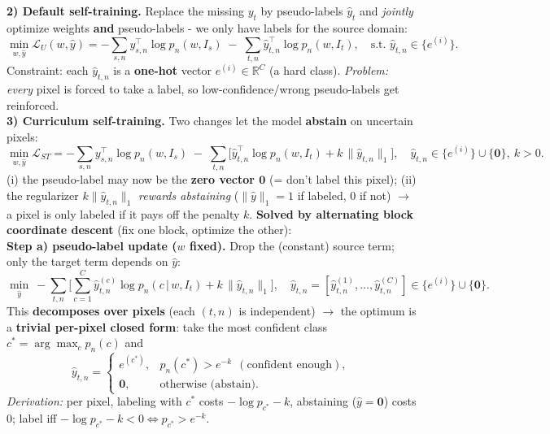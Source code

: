 \documentclass{article}
\begin{document}
\textbf{2) Default self-training.} Replace the missing $y_t$ by pseudo-labels $\hat y_t$ and \textit{jointly} optimize weights \textbf{and} pseudo-labels - we only have labels for the source domain:
\begin{equation*}
\min_{w,\hat y} \mathcal{L}_U(w,\hat y) = -\sum_{s,n} y_{s,n}^\top\log p_n(w,I_s) \;-\; \sum_{t,n} \hat y_{t,n}^\top\log p_n(w,I_t),\quad \text{s.t. } \hat y_{t,n}\in\{e^{(i)}\}.
\end{equation*}
Constraint: each $\hat y_{t,n}$ is a \textbf{one-hot} vector $e^{(i)}\in\mathbb{R}^C$ (a hard class). \textit{Problem:} \textit{every} pixel is forced to take a label, so low-confidence/wrong pseudo-labels get reinforced.\\

\textbf{3) Curriculum self-training.} Two changes let the model \textbf{abstain} on uncertain pixels:
\begin{equation*}
\min_{w,\hat y} \mathcal{L}_{ST} = -\sum_{s,n} y_{s,n}^\top\log p_n(w,I_s) \;-\; \sum_{t,n}\Big[\hat y_{t,n}^\top\log p_n(w,I_t) + k\,\lVert\hat y_{t,n}\rVert_1\Big],\quad \hat y_{t,n}\in\{e^{(i)}\}\cup\{\mathbf 0\},\ k>0.
\end{equation*}
(i) the pseudo-label may now be the \textbf{zero vector $\mathbf 0$} (= don't label this pixel); (ii) the regularizer $k\lVert\hat y_{t,n}\rVert_1$ \textit{rewards abstaining} ($\lVert\hat y\rVert_1=1$ if labeled, $0$ if not) $\rightarrow$ a pixel is only labeled if it pays off the penalty $k$. \textbf{Solved by alternating block coordinate descent} (fix one block, optimize the other):\\

\textbf{Step a) pseudo-label update ($w$ fixed).} Drop the (constant) source term; only the target term depends on $\hat y$:
\begin{equation*}
\min_{\hat y}\ -\sum_{t,n}\Big[\sum_{c=1}^C \hat y^{(c)}_{t,n}\log p_n(c\,|\,w,I_t) + k\,\lVert\hat y_{t,n}\rVert_1\Big],\quad \hat y_{t,n}=[\hat y^{(1)}_{t,n},\dots,\hat y^{(C)}_{t,n}]\in\{e^{(i)}\}\cup\{\mathbf 0\}.
\end{equation*}
This \textbf{decomposes over pixels} (each $(t,n)$ is independent) $\rightarrow$ the optimum is a \textbf{trivial per-pixel closed form}: take the most confident class $c^*=\arg\max_c p_n(c)$ and
\begin{equation*}
\hat y_{t,n} = \begin{cases} e^{(c^*)}, & p_n(c^*) > e^{-k}\ \ (\text{confident enough}),\\ \mathbf 0, & \text{otherwise (abstain)}.\end{cases}
\end{equation*}
\textit{Derivation:} per pixel, labeling with $c^*$ costs $-\log p_{c^*}-k$, abstaining ($\hat y=\mathbf 0$) costs $0$; label iff $-\log p_{c^*}-k<0 \Leftrightarrow p_{c^*}>e^{-k}$.\\
\end{document}

